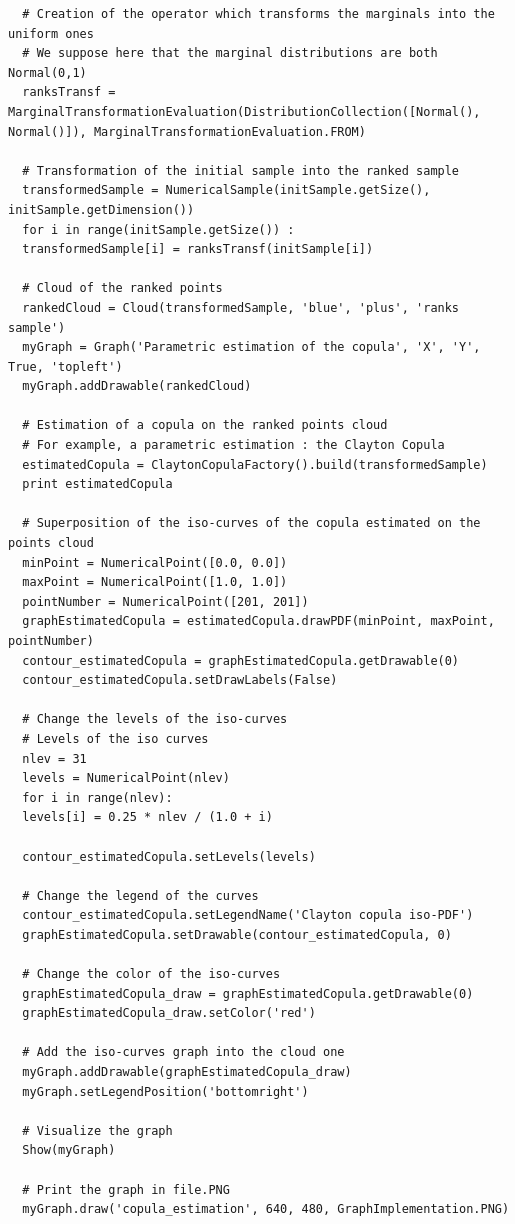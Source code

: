 \begin{lstlisting}
  # Creation of the operator which transforms the marginals into the uniform ones
  # We suppose here that the marginal distributions are both Normal(0,1)
  ranksTransf = MarginalTransformationEvaluation(DistributionCollection([Normal(), Normal()]), MarginalTransformationEvaluation.FROM)

  # Transformation of the initial sample into the ranked sample
  transformedSample = NumericalSample(initSample.getSize(), initSample.getDimension())
  for i in range(initSample.getSize()) :
  transformedSample[i] = ranksTransf(initSample[i])

  # Cloud of the ranked points
  rankedCloud = Cloud(transformedSample, 'blue', 'plus', 'ranks sample')
  myGraph = Graph('Parametric estimation of the copula', 'X', 'Y', True, 'topleft')
  myGraph.addDrawable(rankedCloud)

  # Estimation of a copula on the ranked points cloud
  # For example, a parametric estimation : the Clayton Copula
  estimatedCopula = ClaytonCopulaFactory().build(transformedSample)
  print estimatedCopula

  # Superposition of the iso-curves of the copula estimated on the points cloud
  minPoint = NumericalPoint([0.0, 0.0])
  maxPoint = NumericalPoint([1.0, 1.0])
  pointNumber = NumericalPoint([201, 201])
  graphEstimatedCopula = estimatedCopula.drawPDF(minPoint, maxPoint, pointNumber)
  contour_estimatedCopula = graphEstimatedCopula.getDrawable(0)
  contour_estimatedCopula.setDrawLabels(False)

  # Change the levels of the iso-curves
  # Levels of the iso curves
  nlev = 31
  levels = NumericalPoint(nlev)
  for i in range(nlev):
  levels[i] = 0.25 * nlev / (1.0 + i)

  contour_estimatedCopula.setLevels(levels)

  # Change the legend of the curves
  contour_estimatedCopula.setLegendName('Clayton copula iso-PDF')
  graphEstimatedCopula.setDrawable(contour_estimatedCopula, 0)

  # Change the color of the iso-curves
  graphEstimatedCopula_draw = graphEstimatedCopula.getDrawable(0)
  graphEstimatedCopula_draw.setColor('red')

  # Add the iso-curves graph into the cloud one
  myGraph.addDrawable(graphEstimatedCopula_draw)
  myGraph.setLegendPosition('bottomright')

  # Visualize the graph
  Show(myGraph)

  # Print the graph in file.PNG
  myGraph.draw('copula_estimation', 640, 480, GraphImplementation.PNG)
\end{lstlisting}
\textspace\\


